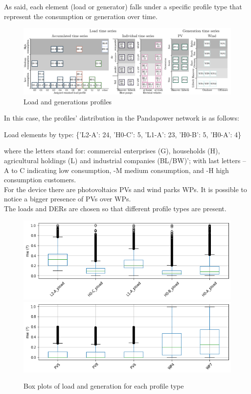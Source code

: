 As said, each element (load or generator) falls under a specific profile type that represent the consumption or generation over time.

\begin{figure}[H]
\centering
    \includegraphics[width=.8\linewidth]{images/MVOberr/SimBench load and generation time series.PNG}
\caption{Load and generations profiles}
\label{fig:gym_anm_net}
\end{figure}

In this case, the profiles' distribution in the Pandapower network is as follows:

\begin{algorithm}[h]
\State Load elements by type: \{'L2-A': 24, 'H0-C': 5, 'L1-A': 23, 'H0-B': 5, 'H0-A': 4\}

\end{algorithm}
\noindent where the letters stand for: commercial enterprises (G), households (H), agricultural holdings (L) and industrial companies (BL/BW)'; with last letters –A to C indicating low consumption, -M medium consumption, and -H high consumption customers. \\
For the  device there are photovoltaics \glspl{PV} and wind parks \glspl{WP}. It is possible to notice a bigger presence of \glspl{PV} over \glspl{WP}.\\

The loads and \glspl{DER} are chosen so that different profile types are present.



\begin{figure}[H]
\centering
    \includegraphics[width=.7\linewidth]{images/MVOberr/BoxPlotLoad.png}
    \includegraphics[width=.7\linewidth]{images/MVOberr/BoxPlotRes.png}
\caption{Box plots of load and generation for each profile type}
\label{fig:gym_anm_net}
\end{figure}


